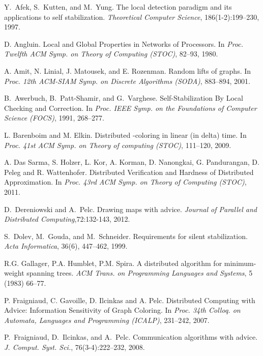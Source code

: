 \documentclass{llncs}
\begin{document}
\begin{thebibliography}{99}

Y.~Afek, S.~Kutten, and M.~Yung.
\newblock The local detection paradigm and its applications to self
  stabilization.
\newblock \emph{Theoretical Computer Science}, 186(1-2):199--230, 1997.

D. Angluin.
\newblock Local and Global Properties in Networks of Processors.
\newblock In \emph{Proc. Twelfth ACM Symp. on Theory of Computing (STOC)}, 
82--93, 1980. 

A. Amit, N. Linial, J. Matousek, and E. Rozenman.
\newblock Random lifts of graphs.
\newblock  In \emph{Proc. 12th ACM-SIAM Symp. on Discrete Algorithms (SODA)},  883--894, 2001.

B.~Awerbuch, B.~Patt-Shamir, and G.~Varghese.
\newblock Self-Stabilization By Local Checking and Correction.
\newblock In \emph{ Proc. IEEE Symp. on the Foundations of Computer
Science (FOCS)}, 1991, 268--277.

L. Barenboim and M. Elkin.
\newblock Distributed -coloring in linear (in delta) time.
\newblock In \emph{Proc. 41st ACM Symp. on Theory of computing (STOC)}, 111--120,
2009.

A. Das Sarma, S. Holzer,  L. Kor, A.  Korman, D. Nanongkai, G. Pandurangan,
D. Peleg and R. Wattenhofer.
\newblock Distributed Verification and Hardness of Distributed Approximation.
\newblock In \emph{Proc. 43rd ACM Symp. on Theory of Computing (STOC)}, 2011.

D.~Dereniowski and A.~Pelc.
\newblock Drawing maps with advice.
\newblock \emph{Journal of Parallel and Distributed Computing},72:132-143, 2012.

S.~Dolev, M.~Gouda, and M.~Schneider.
\newblock Requirements for silent stabilization.
\newblock \emph{Acta Informatica}, 36(6), 447--462, 1999.


R.G. Gallager, P.A. Humblet, P.M. Spira.
\newblock A distributed algorithm for minimum-weight
spanning trees.
\newblock \emph{ACM Trans. on Programming Languages and Systems}, 5 (1983) 66--77.

P. Fraigniaud, C. Gavoille, D. Ilcinkas and A. Pelc.
\newblock Distributed Computing with Advice: Information Sensitivity
of Graph Coloring.
\newblock  In \emph{Proc. 34th Colloq. on Automata, Languages and
Programming (ICALP)}, 231--242, 2007.

P.~Fraigniaud, D.~Ilcinkas, and A.~Pelc.
\newblock Communication algorithms with advice.
\newblock \emph{J. Comput. Syst. Sci.}, 76(3-4):222--232, 2008.


\end{thebibliography}
\end{document}
